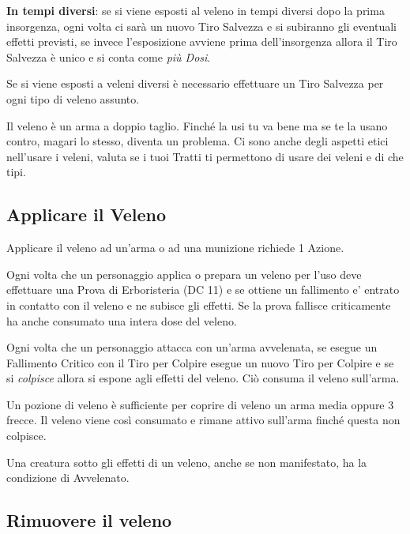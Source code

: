 \begin{multicols}{2}
\textbf{In tempi diversi}: se si viene esposti al veleno in tempi diversi dopo la prima insorgenza, ogni volta ci sarà un nuovo Tiro Salvezza e si subiranno gli eventuali effetti previsti, se invece l'esposizione avviene prima dell'insorgenza allora il Tiro Salvezza è unico e si conta come \emph{più Dosi}.

Se si viene esposti a veleni diversi è necessario effettuare un Tiro Salvezza per ogni tipo di veleno assunto.

\begin{changemargin}{0.3cm}{0.3cm}\begin{tcolorbox}[title = Veleno ?]
{Il veleno è un arma a doppio taglio. Finché la usi tu va bene ma se te la usano contro, magari lo stesso, diventa un problema. Ci sono anche degli aspetti etici nell'usare i veleni, valuta se i tuoi Tratti ti permettono di usare dei veleni e di che tipi.}\end{tcolorbox}\end{changemargin}

\subsection{Applicare il Veleno}\label{applicareveleno}

Applicare il veleno ad un'arma o ad una munizione richiede 1 Azione.

Ogni volta che un personaggio applica o prepara un veleno per l'uso deve effettuare una Prova di Erboristeria (DC 11) e se ottiene un fallimento e' entrato in contatto con il veleno e ne subisce gli effetti. Se la prova fallisce criticamente ha anche consumato una intera dose del veleno.

Ogni volta che un personaggio attacca con un'arma avvelenata, se esegue un Fallimento Critico con il Tiro per Colpire esegue un nuovo Tiro per Colpire e se si \emph{colpisce} allora si espone agli effetti del veleno. Ciò consuma il veleno sull'arma.

Un pozione di veleno è sufficiente per coprire di veleno un arma media oppure 3 frecce. Il veleno viene così consumato e rimane attivo sull'arma finché questa non colpisce.

Una creatura sotto gli effetti di un veleno, anche se non manifestato, ha la condizione di Avvelenato.

\subsection{Rimuovere il veleno}


\end{multicols}
